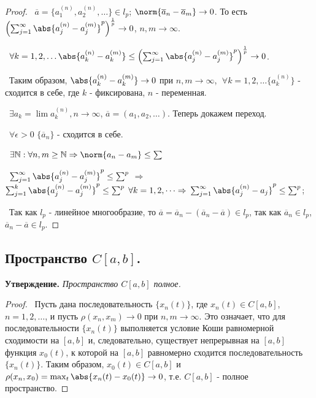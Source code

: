 \begin{proof}
\par\noindent \textbullet~$\overline{a} = \{ a_1^{(n)}, a_2^{(n)}, \dots\} \in l_p$; $\norm{\overline{a}_n - \overline{a}_m} \to 0$. То есть $\left(\sum_{j = 1}^\infty 
\abs{a_j^{(n)} - a_j^{(m)}}^p\right)^\frac{1}{p} \to 0$, $n, m \to \infty$. 

\smallskip
\noindent \textbullet~$\forall k = 1, 2, \dots \abs{a_k^{(n)} - a_k^{(m)}} \le \left(\sum_{j = 1}^\infty \abs{a_j^{(n)} - a_j^{(m)}}^p\right)^{\frac{1}{p}} \to 0$. 

\smallskip 
\noindent \textbullet~Таким образом, $\abs{a_k^{(n)} - a_k^{(m)}} \to  0$ при $n, m \to \infty$, $\; \forall k = 1, 2, \dots \{ a_k^{(n)}\}$ - сходится в себе,
где $k$ - фиксирована, $n$ - переменная.

\smallskip 
\noindent \textbullet~$\exists a_k = \lim a_k^{(n)} , n \to \infty$, $\overline{a} = (a_1, a_2, \dots)$. Теперь докажем переход.

\medskip
\noindent \textbullet~$\forall \epsilon > 0$ $\{ \overline{a}_n\}$ - сходится в себе.

\smallskip
\noindent \textbullet~$\exists \mathbb{N} : \forall n, m \ge \mathbb{N} \Rightarrow \norm{a_n - a_m} \le \sum$

\smallskip
\noindent \textbullet~$\sum_{j = 1}^\infty \abs{a_j^{(n)} - a_j^{(m)}}^p \le \sum^p$ $\Rightarrow$
$\sum_{j = 1}^k \abs{a_j^{(n)} - a_j^{(m)}}^p \le \sum^p \; \forall k = 1, 2, \dots \Rightarrow$
$\sum_{j = 1}^\infty \abs{a_j^{(n)} - a_j}^p \le \sum^p$;

\smallskip 
\noindent \textbullet~Так как $l_p$ - линейное многообразие, то $\overline{a} = \overline{a}_n - (\overline{a}_n - \overline{a}) \in l_p$, так как 
$\overline{a}_n \in l_p$, $\overline{a}_n - \overline{a} \in l_p$.

\end{proof}


\subsection*{Пространство $C[a, b]$.}

\noindent \textbf{Утверждение. }\textit{Пространство $C[a, b]$ полное.}

\begin{proof}
\par\noindent \textbullet~Пусть дана последовательность $\{ x_n(t)\}$, где $x_n(t) \in C[a, b]$, $n = 1, 2, \dots$, и пусть $\rho(x_n, x_m) \to 0$ при $n, m \to \infty$.
Это означает, что для последовательности $\{ x_n (t)\}$ выполняется условие Коши равномерной сходимости на $[a, b]$ и, следовательно, существует непрерывная на $[a, b]$
функция $x_0(t)$, к которой на $[a, b]$ равномерно сходится последовательность $\{x_n(t)\}$. Таким образом, $x_0(t) \in C[a, b]$ и $\rho(x_n, x_0) = \max_t \abs{x_n(t) 
- x_0(t)} \to 0$, т.е. $C[a, b]$ - полное пространство.
\end{proof}
